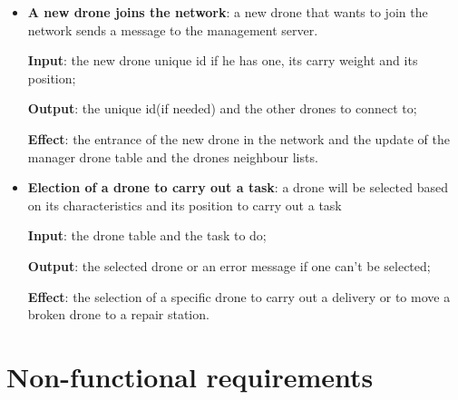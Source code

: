 \documentclass[a4paper, oneside]{memoir}
\begin{document}
\begin{itemize}
\item \textbf{A new drone joins the network}: a new drone that wants to join the network sends a message to the management server.

	\textbf{Input}: the new drone unique id if he has one, its carry weight and its position;

	\textbf{Output}: the unique id(if needed) and the other drones to connect to;

	\textbf{Effect}: the entrance of the new drone in the network and the update of the manager drone table and the drones neighbour lists.

\item \textbf{Election of a drone to carry out a task}: a drone will be selected based on its characteristics and its position to carry out a task

	\textbf{Input}: the drone table and the task to do;

	\textbf{Output}: the selected drone or an error message if one can't be selected;

	\textbf{Effect}: the selection of a specific drone to carry out a delivery or to move a broken drone to a repair station.

\end{itemize}

\section{Non-functional requirements}
\label{nfunc-req}
\end{document}
